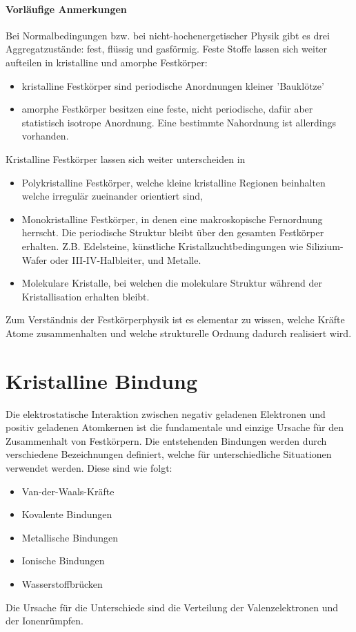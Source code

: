 \paragraph{Vorläufige Anmerkungen}
Bei Normalbedingungen bzw. bei nicht-hochenergetischer Physik gibt es drei Aggregatzustände: fest, flüssig und gasförmig. 
Feste Stoffe lassen sich weiter aufteilen in kristalline und amorphe Festkörper:
\begin{itemize}
	\item kristalline Festkörper sind periodische Anordnungen kleiner 'Bauklötze'
	\item amorphe Festkörper besitzen eine feste, nicht periodische, dafür aber statistisch isotrope Anordnung. Eine bestimmte Nahordnung ist allerdings vorhanden. 
\end{itemize}
Kristalline Festkörper lassen sich weiter unterscheiden in
\begin{itemize}
	\item Polykristalline Festkörper, welche kleine kristalline Regionen beinhalten welche irregulär zueinander orientiert sind,
	\item Monokristalline Festkörper, in denen eine makroskopische Fernordnung herrscht. Die periodische Struktur bleibt über den gesamten Festkörper erhalten. Z.B. Edelsteine, künstliche Kristallzuchtbedingungen wie Silizium-Wafer oder III-IV-Halbleiter, und Metalle.
	\item Molekulare Kristalle, bei welchen die molekulare Struktur während der Kristallisation erhalten bleibt.
\end{itemize}

Zum Verständnis der Festkörperphysik ist es elementar zu wissen, welche Kräfte Atome zusammenhalten und welche strukturelle Ordnung dadurch realisiert wird.

\section{Kristalline Bindung}
Die elektrostatische Interaktion zwischen negativ geladenen Elektronen und positiv geladenen Atomkernen ist die fundamentale und einzige Ursache für den Zusammenhalt von Festkörpern. 
Die entstehenden Bindungen werden durch verschiedene Bezeichnungen definiert, welche für unterschiedliche Situationen verwendet werden. Diese sind wie folgt:
\begin{itemize}
	\item Van-der-Waals-Kräfte
	\item Kovalente Bindungen
	\item Metallische Bindungen
	\item Ionische Bindungen
	\item Wasserstoffbrücken
\end{itemize}
Die Ursache für die Unterschiede sind die Verteilung der Valenzelektronen und der Ionenrümpfen.

